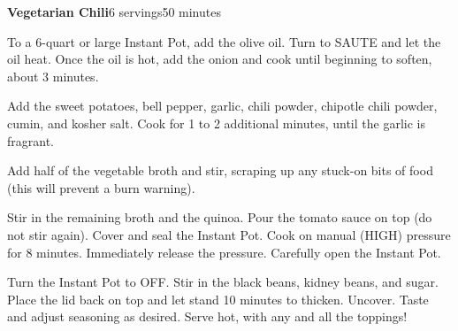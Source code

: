 \documentclass[../Cookbook.tex]{subfiles}
\begin{document}
\begin{recipe}[VegetarianChili]{\textbf{Vegetarian Chili}}{6 servings}{50 minutes}

To a 6-quart or large Instant Pot, add the olive oil. Turn to SAUTE and let the oil heat. Once the oil is hot, add the onion and cook until beginning to soften, about 3 minutes.

Add the sweet potatoes, bell pepper, garlic, chili powder, chipotle chili powder, cumin, and kosher salt. Cook for 1 to 2 additional minutes, until the garlic is fragrant.

Add half of the vegetable broth and stir, scraping up any stuck-on bits of food (this will prevent a burn warning).

Stir in the remaining broth and the quinoa. Pour the tomato sauce on top (do not stir again).
Cover and seal the Instant Pot. Cook on manual (HIGH) pressure for 8 minutes. Immediately release the pressure. Carefully open the Instant Pot.

Turn the Instant Pot to OFF. Stir in the black beans, kidney beans, and sugar. Place the lid back on top and let stand 10 minutes to thicken. Uncover. Taste and adjust seasoning as desired. Serve hot, with any and all the toppings!

\end{recipe}
\end{document}
